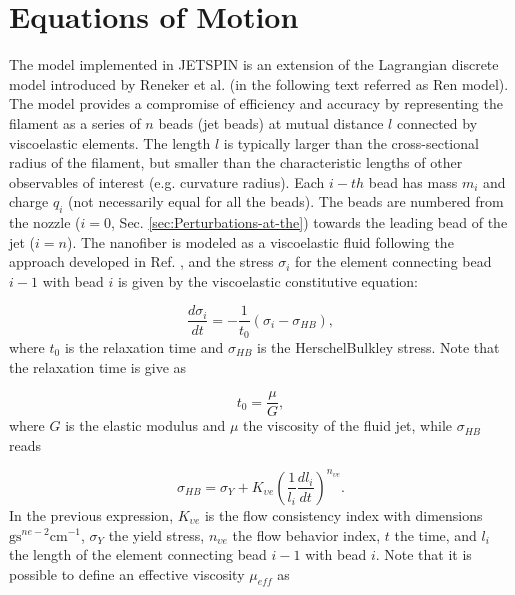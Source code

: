 
\section{Equations of Motion\label{sec:Equation-of-Motion}}

The model implemented in JETSPIN is an extension of the Lagrangian
discrete model introduced by Reneker et al. \cite{reneker2000bending}
(in the following text referred as Ren model). The model provides
a compromise of efficiency and accuracy by representing the filament
as a series of $n$ beads (jet beads) at mutual distance $l$ connected
by viscoelastic elements. The length $l$ is typically larger than
the cross-sectional radius of the filament, but smaller than the characteristic
lengths of other observables of interest (e.g. curvature radius).
Each $i-th$ bead has mass $m_{i}$ and charge $q_{i}$ (not necessarily
equal for all the beads). The beads are numbered from the nozzle
($i=0$, Sec. \ref{sec:Perturbations-at-the}) towards the leading bead
of the jet ($i=n$). The nanofiber is modeled as a viscoelastic
fluid following the approach developed in Ref. \cite{pontrelli2014electrospinning},
and the stress $\sigma_{i}$ for the element connecting bead $i-1$
with bead $i$ is given by the viscoelastic constitutive equation:

\begin{equation}
\frac{d\sigma_{i}}{dt}=-\frac{1}{t_{0}}\left(\sigma_{i}-\sigma_{HB}\right),\label{eq:huang-garcia}
\end{equation}
where $t_{0}$ is the relaxation time and $\sigma_{HB}$ is the Herschel\textendash Bulkley
stress. Note that the relaxation time is give as

\begin{equation}
t_{0}=\frac{\mu}{G},\label{eq:relaxation-time}
\end{equation}
where $G$ is the elastic modulus and $\mu$ the viscosity of the
fluid jet, while $\sigma_{HB}$ reads

\begin{equation}
\sigma_{HB}=\sigma_{Y}+K_{\upsilon e}\left(\frac{1}{l_{i}}\frac{dl_{i}}{dt}\right)^{n_{\upsilon e}}.\label{eq:Herschel=00003D002013Bulkley}
\end{equation}
In the previous expression, $K_{\upsilon e}$ is the flow consistency
index with dimensions $\text{g}\text{s}^{ne-2}\text{cm}^{-1}$, $\sigma_{Y}$
the yield stress, $n_{\upsilon e}$ the flow behavior index, $t$
the time, and $l_{i}$ the length of the element connecting bead $i-1$
with bead $i$. Note that it is possible to define an effective
viscosity $\mu_{eff}$ as

